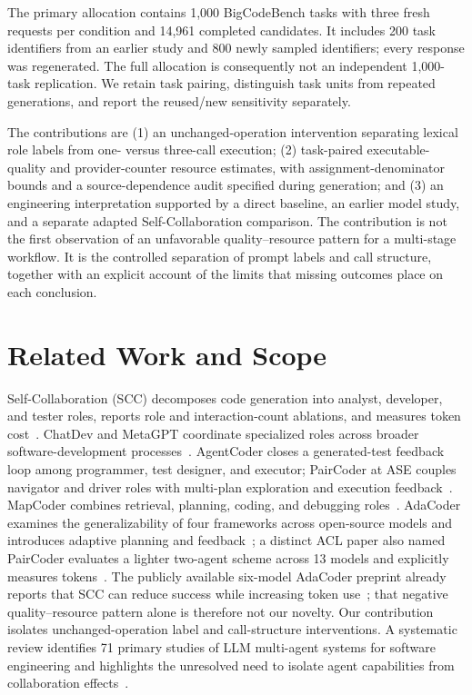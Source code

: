 The primary allocation contains 1,000 BigCodeBench tasks with three fresh requests per condition and 14,961 completed candidates. It includes 200 task identifiers from an earlier study and 800 newly sampled identifiers; every response was regenerated. The full allocation is consequently not an independent 1,000-task replication. We retain task pairing, distinguish task units from repeated generations, and report the reused/new sensitivity separately.

The contributions are (1) an unchanged-operation intervention separating lexical role labels from one- versus three-call execution; (2) task-paired executable-quality and provider-counter resource estimates, with assignment-denominator bounds and a source-dependence audit specified during generation; and (3) an engineering interpretation supported by a direct baseline, an earlier model study, and a separate adapted Self-Collaboration comparison. The contribution is not the first observation of an unfavorable quality--resource pattern for a multi-stage workflow. It is the controlled separation of prompt labels and call structure, together with an explicit account of the limits that missing outcomes place on each conclusion.

\section{Related Work and Scope}
\aieditnote
Self-Collaboration (SCC) decomposes code generation into analyst, developer, and tester roles, reports role and interaction-count ablations, and measures token cost~\cite{dong2023selfcollaboration}. ChatDev and MetaGPT coordinate specialized roles across broader software-development processes~\cite{qian2024chatdev,hong2024metagpt}. AgentCoder closes a generated-test feedback loop among programmer, test designer, and executor; PairCoder at ASE couples navigator and driver roles with multi-plan exploration and execution feedback~\cite{huang2023agentcoder,zhang2024paircoder}. MapCoder combines retrieval, planning, coding, and debugging roles~\cite{islam2024mapcoder}. AdaCoder examines the generalizability of four frameworks across open-source models and introduces adaptive planning and feedback~\cite{zhu2025adacoderpreprint,zhu2026adacoder}; a distinct ACL paper also named PairCoder evaluates a lighter two-agent scheme across 13 models and explicitly measures tokens~\cite{chen2026paircoder}. The publicly available six-model AdaCoder preprint already reports that SCC can reduce success while increasing token use~\cite{zhu2025adacoderpreprint}; that negative quality--resource pattern alone is therefore not our novelty. Our contribution isolates unchanged-operation label and call-structure interventions. A systematic review identifies 71 primary studies of LLM multi-agent systems for software engineering and highlights the unresolved need to isolate agent capabilities from collaboration effects~\cite{he2025lma}.

